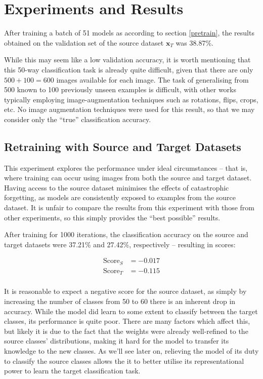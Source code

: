 \documentclass{report}
\newcommand{\SCORE}[2]{
	\begin{align*}
	\text{Score}_S &= #1 \\
	\text{Score}_T &= #2 \\
	\end{align*}
}
\begin{document}
	\section{Experiments and Results}
	After training a batch of 51 models as according to section \ref{pretrain}, the results obtained on the validation set of the source dataset $\bm{x}_T$ was 38.87\%. \par
	While this may seem like a low validation accuracy, it is worth mentioning that this 50-way classification task is already quite difficult, given that there are only $500+100=600$ images available for each image. The task of generalising from 500 known to 100 previously unseen examples is difficult, with other works typically employing image-augmentation techniques such as rotations, flips, crops, etc. No image augmentation techniques were used for this result, so that we may consider only the ``true'' classification accuracy. \par
	
	\subsection{Retraining with Source and Target Datasets}
	This experiment explores the performance under ideal circumstances -- that is, where training can occur using images from both the source and target dataset. Having access to the source dataset minimises the effects of catastrophic forgetting, as models are consistently exposed to examples from the source dataset. It is unfair to compare the results from this experiment with those from other experiments, so this simply provides the ``best possible'' results. \par
	After training for 1000 iterations, the classification accuracy on the source and target datasets were 37.21\% and 27.42\%, respectively -- resulting in scores:
	\SCORE{-0.017}{-0.115}
	
	It is reasonable to expect a negative score for the source dataset, as simply by increasing the number of classes from 50 to 60 there is an inherent drop in accuracy. While the model did learn to some extent to classify between the target classes, its performance is quite poor. There are many factors which affect this, but likely it is due to the fact that the weights were already well-refined to the source classes' distributions, making it hard for the model to transfer its knowledge to the new classes. As we'll see later on, relieving the model of its duty to classify the source classes allows the it to better utilise its representational power to learn the target classification task. \par
\end{document}

